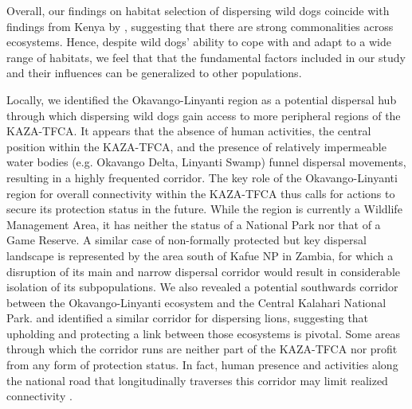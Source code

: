 \documentclass[abstract=on,10pt,a4paper,bibliography=totocnumbered]{article}
\begin{document}
Overall, our findings on habitat selection of dispersing wild dogs coincide with
findings from Kenya by \cite{Oneill.2020}, suggesting that there are strong
commonalities across ecosystems. Hence, despite wild dogs' ability to cope with
and adapt to a wide range of habitats, we feel that that the fundamental factors
included in our study and their influences can be generalized to other
populations.

Locally, we identified the Okavango-Linyanti region as a potential dispersal hub
through which dispersing wild dogs gain access to more peripheral regions of the
KAZA-TFCA. It appears that the absence of human activities, the central position
within the KAZA-TFCA, and the presence of relatively impermeable water bodies
(e.g. Okavango Delta, Linyanti Swamp) funnel dispersal movements, resulting in a
highly frequented corridor. The key role of the Okavango-Linyanti region for
overall connectivity within the KAZA-TFCA thus calls for actions to secure its
protection status in the future. While the region is currently a Wildlife
Management Area, it has neither the status of a National Park nor that of a Game
Reserve. A similar case of non-formally protected but key dispersal landscape is
represented by the area south of Kafue NP in Zambia, for which a disruption of
its main and narrow dispersal corridor would result in considerable isolation of
its subpopulations. We also revealed a potential southwards corridor between the
Okavango-Linyanti ecosystem and the Central Kalahari National Park.
\cite{Elliot.2014} and \cite{Cushman.2018} identified a similar corridor for
dispersing lions, suggesting that upholding and protecting a link between those
ecosystems is pivotal. Some areas through which the corridor runs are neither
part of the KAZA-TFCA nor profit from any form of protection status. In fact,
human presence and activities along the national road that longitudinally
traverses this corridor may limit realized connectivity \citep{Cozzi.2020}.
\end{document}
